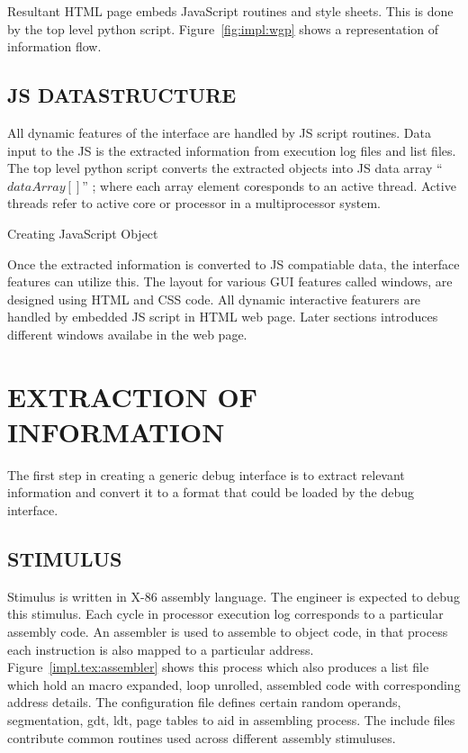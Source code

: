 Resultant HTML page embeds JavaScript routines and style sheets. This is done by the top level python script. Figure~\ref{fig:impl:wgp} shows a representation of information flow.


\subsection{JS DATASTRUCTURE}
All dynamic features of the interface are handled by JS script routines. Data input to the JS is the extracted information from execution log files and list files. The top level python script converts the extracted objects into JS data array ``$dataArray[]$'' ; where each array element coresponds to an active thread. Active threads refer to active core or processor in a multiprocessor system.  

\IncMargin{1em}
\begin{algorithm}[h]
\DontPrintSemicolon
{} 
\KwFn {}
\BlankLine
{}
\caption{Creating JavaScript Object}
\end{algorithm}\DecMargin{1em}



Once the extracted information is converted to JS compatiable data, the interface features can utilize this. The layout for various GUI features called windows, are designed using HTML and CSS code. All dynamic interactive featurers are handled by embedded JS script in HTML web page. Later sections introduces different windows availabe in the web page.

\section {EXTRACTION OF INFORMATION}
The first step in creating a generic debug interface is to extract relevant information and convert it to a format that could be loaded by the debug interface.

\subsection {STIMULUS}
Stimulus is written in X-86 assembly language. The engineer is expected to debug this stimulus. Each cycle in processor execution log corresponds to a particular assembly code. An assembler is used to assemble to object code, in that process each instruction is also mapped to a particular address. Figure~\ref{impl.tex:assembler} shows this process which also produces a list file which hold an macro expanded, loop unrolled, assembled code with corresponding address details. The configuration file defines certain random operands, segmentation, gdt, ldt, page tables to aid in assembling process. The include files contribute common routines used across different assembly stimuluses.

